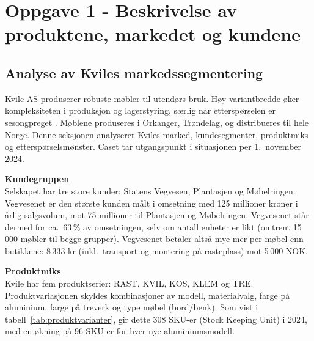\section*{Oppgave 1 - Beskrivelse av produktene, markedet og kundene}
\setcounter{section}{1}
\setcounter{subsection}{0}


\subsection{Analyse av Kviles markedssegmentering}
Kvile AS produserer robuste møbler til utendørs bruk. Høy variantbredde øker kompleksiteten i produksjon og lagerstyring, særlig når etterspørselen er sesongpreget \parencite{strandhagen2024}. Møblene produseres i Orkanger, Trøndelag, og distribueres til hele Norge. Denne seksjonen analyserer Kviles marked, kundesegmenter, produktmiks og etterspørselsmønster. Caset tar utgangspunkt i situasjonen per 1.\ november 2024.

\textbf{Kundegruppen}\\
Selskapet har tre store kunder: Statens Vegvesen, Plantasjen og Møbelringen. Vegvesenet er den største kunden målt i omsetning med 125 millioner kroner i årlig salgsvolum, mot 75 millioner til Plantasjen og Møbelringen. Vegvesenet står dermed for ca.\ 63\,\% av omsetningen, selv om antall enheter er likt (omtrent 15\,000 møbler til begge grupper). Vegvesenet betaler altså mye mer per møbel enn butikkene: 8\,333 kr (inkl.\ transport og montering på rasteplass) mot 5\,000 NOK.

\textbf{Produktmiks}\\
Kvile har fem produktserier: RAST, KVIL, KOS, KLEM og TRE. Produktvariasjonen skyldes kombinasjoner av modell, materialvalg, farge på aluminium, farge på treverk og type møbel (bord/benk). Som vist i tabell~\ref{tab:produktvarianter}, gir dette 308 SKU-er (Stock Keeping Unit) i 2024, med en økning på 96 SKU-er for hver nye aluminiumsmodell.

